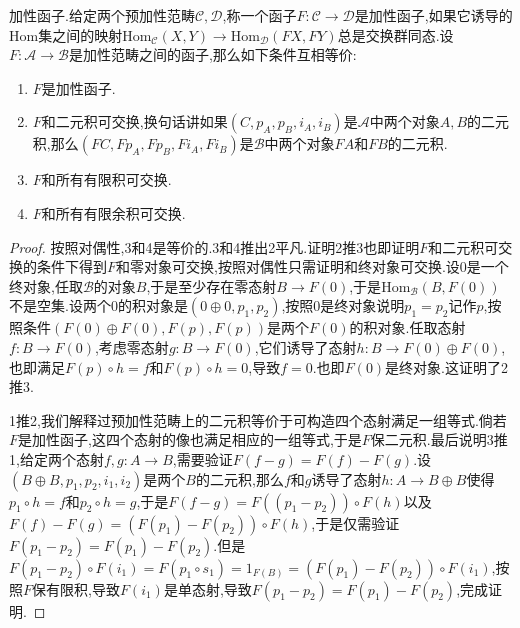 加性函子.给定两个预加性范畴$\mathscr{C},\mathscr{D}$,称一个函子$F:\mathscr{C}\to\mathscr{D}$是加性函子,如果它诱导的Hom集之间的映射$\mathrm{Hom}_{\mathscr{C}}(X,Y)\to\mathrm{Hom}_{\mathscr{D}}(FX,FY)$总是交换群同态.设$F:\mathscr{A}\to\mathscr{B}$是加性范畴之间的函子,那么如下条件互相等价:
\begin{enumerate}
	\item $F$是加性函子.
	\item $F$和二元积可交换,换句话讲如果$(C,p_A,p_B,i_A,i_B)$是$\mathscr{A}$中两个对象$A,B$的二元积,那么$(FC,Fp_A,Fp_B,Fi_A,Fi_B)$是$\mathscr{B}$中两个对象$FA$和$FB$的二元积.
	\item $F$和所有有限积可交换.
	\item $F$和所有有限余积可交换.
\end{enumerate}
\begin{proof}
	
	按照对偶性,3和4是等价的.3和4推出2平凡.证明2推3也即证明$F$和二元积可交换的条件下得到$F$和零对象可交换,按照对偶性只需证明和终对象可交换.设0是一个终对象,任取$\mathscr{B}$的对象$B$,于是至少存在零态射$B\to F(0)$,于是$\mathrm{Hom}_{\mathscr{B}}(B,F(0))$不是空集.设两个0的积对象是$(0\oplus0,p_1,p_2)$,按照0是终对象说明$p_1=p_2$记作$p$,按照条件$(F(0)\oplus F(0),F(p),F(p))$是两个$F(0)$的积对象.任取态射$f:B\to F(0)$,考虑零态射$g:B\to F(0)$,它们诱导了态射$h:B\to F(0)\oplus F(0)$,也即满足$F(p)\circ h=f$和$F(p)\circ h=0$,导致$f=0$.也即$F(0)$是终对象.这证明了2推3.
	
	1推2,我们解释过预加性范畴上的二元积等价于可构造四个态射满足一组等式.倘若$F$是加性函子,这四个态射的像也满足相应的一组等式,于是$F$保二元积.最后说明3推1,给定两个态射$f,g:A\to B$,需要验证$F(f-g)=F(f)-F(g)$.设$(B\oplus B,p_1,p_2,i_1,i_2)$是两个$B$的二元积,那么$f$和$g$诱导了态射$h:A\to B\oplus B$使得$p_1\circ h=f$和$p_2\circ h=g$,于是$F(f-g)=F((p_1-p_2))\circ F(h)$以及$F(f)-F(g)=(F(p_1)-F(p_2))\circ F(h)$,于是仅需验证$F(p_1-p_2)=F(p_1)-F(p_2)$.但是$F(p_1-p_2)\circ F(i_1)=F(p_1\circ s_1)=1_{F(B)}=(F(p_1)-F(p_2))\circ F(i_1)$,按照$F$保有限积,导致$F(i_1)$是单态射,导致$F(p_1-p_2)=F(p_1)-F(p_2)$,完成证明.
\end{proof}

